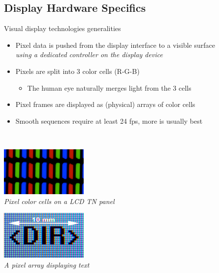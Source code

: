 \subsection{Display Hardware Specifics}

\begin{frame}{Visual display technologies generalities}
  \begin{itemize}
  \item Pixel data is pushed from the display interface to a visible surface\\
  \textit{using a dedicated controller on the display device}
  \item Pixels are split into 3 color cells (R-G-B)
    \begin{itemize}
    \item The human eye naturally merges light from the 3 cells
    \end{itemize}
  \item Pixel frames are displayed as (physical) arrays of color cells
  \item Smooth sequences require at least 24 fps, more is usually best
  \end{itemize}~

  \begin{minipage}[b]{0.45\textwidth}
    \centering
    \includegraphics[height=6.5em]{slides/graphics-hardware/pixel-array.jpg}\\
    \textit{\small Pixel color cells on a LCD TN panel}
  \end{minipage}
  \hfill
  \begin{minipage}[b]{0.45\textwidth}
    \centering
    \includegraphics[height=6.5em]{slides/graphics-hardware/pixel-array-text.jpg}\\
    \textit{\small A pixel array displaying text}
  \end{minipage}
\end{frame}

